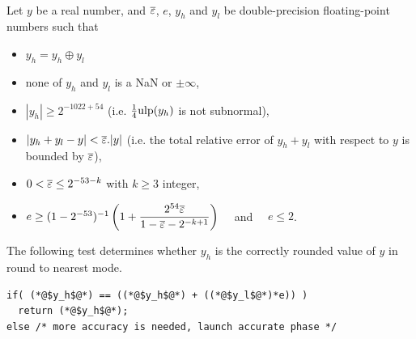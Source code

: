 \begin{theorem}
\label{th:roundingRN1}
~\\
Let $y$ be a real number, and  ${\overline{\varepsilon}}$, $e$, $y_h$ and $y_l$ be
  double-precision floating-point numbers such that 
  \begin{itemize}
  \item $y_h=y_h\oplus y_l$
  \item none of $y_h$ and $y_l$ is a  NaN or $\pm \infty$,
  \item $|y_h|\ge 2^{-1022+54}$ (i.e. $\frac{1}{4}\mbox{ulp}(y_h)$ is not subnormal), 
  \item $|y_h+y_l - y| <{\overline{\varepsilon}}.|y|$ (i.e. the total relative error of
    $y_h+y_l$ with respect to $y$ is bounded by ${\overline{\varepsilon}}$),
  \item $0<{\overline{\varepsilon}} \le 2^{-53-k}$ with $ k \ge 3$ integer,
  \item $e\ge 
  (1-2^{-53})^{-1}\left(
     1+ \dfrac{2^{54}{\overline{\varepsilon}}}{1 - {\overline{\varepsilon}} - 2^{-k+1}}
    \right)
\quad $ and $\quad e\le 2$.
\end{itemize}

The following test determines whether $y_h$ is the
  correctly rounded value of $y$ in  round to nearest mode.

\begin{lstlisting}[caption={Test for rounding to the nearest},
  firstnumber=1]
if( (*@$y_h$@*) == ((*@$y_h$@*) + ((*@$y_l$@*)*e)) )
  return (*@$y_h$@*);
else /* more accuracy is needed, launch accurate phase */
\end{lstlisting}
\end{theorem}


